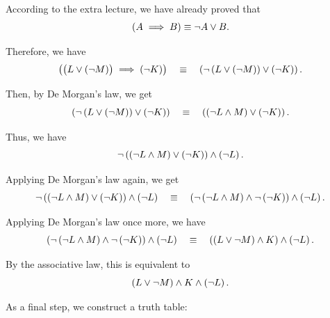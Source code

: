 \begin{solution}
According to the extra lecture, we have already proved that
\begin{equation*}
\left(A \implies B \right) \equiv \neg A \vee B.
\end{equation*}


Therefore, we have 
\begin{equation*}
    \left(
        \bigl(L \lor (\neg M)\bigr)
        \implies (\neg K)
    \right) 
    \quad
    \equiv 
    \quad
    \left(
        \neg \left(
            L \vee \left(\neg M \right)
        \right) \vee
        \left(\neg K\right)
    \right). 
\end{equation*}

Then, by De Morgan's law, we get 
\begin{equation*}
    \left(
        \neg \left(
            L \vee \left(\neg M \right)
        \right) \vee
        \left(\neg K\right)
    \right)
    \quad
    \equiv
    \quad
    \left(
        \left(\neg L \wedge M\right) \vee \left(\neg K\right)
    \right).
\end{equation*}

Thus, we have 
\begin{equation*}
    \neg \left(\left(\neg L \wedge M\right) \vee \left(\neg K\right)\right) \wedge \left(\neg L\right).
\end{equation*}

Applying De Morgan's law again, we get 
\begin{equation*}
     \neg \left(\left(\neg L \wedge M\right) \vee \left(\neg K\right)\right) \wedge \left(\neg L\right) 
     \quad \equiv \quad 
    \left(
        \neg \left(\neg L \wedge M\right) 
        \wedge 
        \neg \left(\neg K\right)
    \right) \wedge \left(\neg L\right).
\end{equation*}

Applying De Morgan's law once more, we have 
\begin{equation*}
    \left(
        \neg \left(\neg L \wedge M\right) 
        \wedge 
        \neg \left(\neg K\right)
    \right) \wedge \left(\neg L\right) 
    \quad \equiv \quad 
    \left(
        \left(L \vee \neg M\right) \wedge K
    \right) \wedge 
    \left(\neg L\right).
\end{equation*}

By the associative law, this is equivalent to 
\begin{equation*}
    \left(L \vee \neg M\right) \wedge K \wedge \left(\neg L\right). 
\end{equation*}

As a final step, we construct a truth table:


\end{solution}
